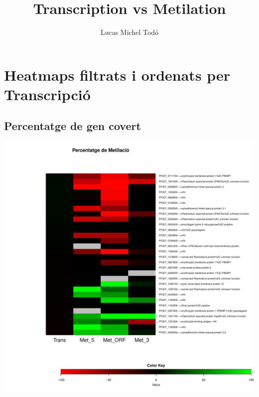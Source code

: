 \documentclass{article}\usepackage[]{graphicx}\usepackage[]{color}
\newenvironment{knitrout}{}{} %
\begin{document}
\title{Transcription vs Metilation}
\author{Lucas Michel Todó}
\maketitle
\tableofcontents
\clearpage







\section{Heatmaps filtrats i ordenats per Transcripció}
\subsection{Percentatge de gen covert}
\begin{knitrout}
\color{fgcolor}

{\centering \includegraphics[width=.9\linewidth]{figure/minimal-trans_percent-1} 

}



\end{knitrout}
\clearpage
\end{document}
